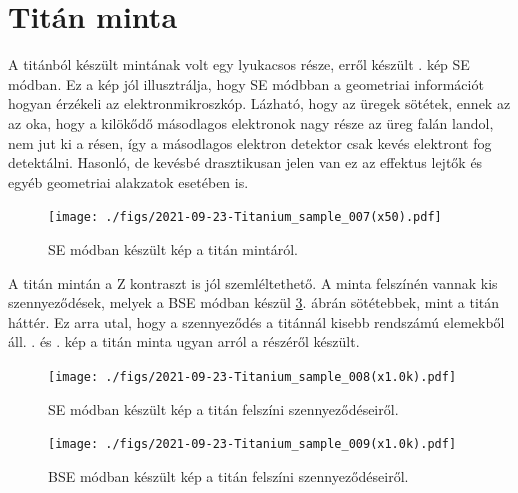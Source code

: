 \documentclass[pdftex,12pt,a4paper]{article}
\begin{document}
	\section{Titán minta}
		A titánból készült mintának volt egy lyukacsos része, erről készült . kép SE módban. Ez a kép jól illusztrálja, hogy SE módbban a geometriai információt hogyan érzékeli az elektronmikroszkóp. Lázható, hogy az üregek sötétek, ennek az az oka, hogy a kilökődő másodlagos elektronok nagy része az üreg falán landol, nem jut ki a résen, így a másodlagos elektron detektor csak kevés elektront fog detektálni. Hasonló, de kevésbé drasztikusan jelen van ez az effektus lejtők és egyéb geometriai alakzatok esetében is. 
		\begin{figure}[H]
			\centering
			\texttt{[image: ./figs/2021-09-23-Titanium\_sample\_007(x50).pdf]}
			\caption{SE módban készült kép a titán mintáról.}
			\label{Tiholes}
		\end{figure}
		A titán mintán a Z kontraszt is jól szemléltethető. A minta felszínén vannak kis szennyeződések, melyek a BSE módban készül \ref{tibse}. ábrán sötétebbek, mint a titán háttér. Ez arra utal, hogy a szennyeződés a titánnál kisebb rendszámú elemekből áll. . és . kép a titán minta ugyan arról a részéről készült.
		\begin{figure}[H]
			\centering
			\texttt{[image: ./figs/2021-09-23-Titanium\_sample\_008(x1.0k).pdf]}
			\caption{SE módban készült kép a titán felszíni szennyeződéseiről.}
			\label{tise}
		\end{figure}
		\begin{figure}[H]
			\centering
			\texttt{[image: ./figs/2021-09-23-Titanium\_sample\_009(x1.0k).pdf]}
			\caption{BSE módban készült kép a titán felszíni szennyeződéseiről.}
			\label{tibse}
		\end{figure}
\end{document}

